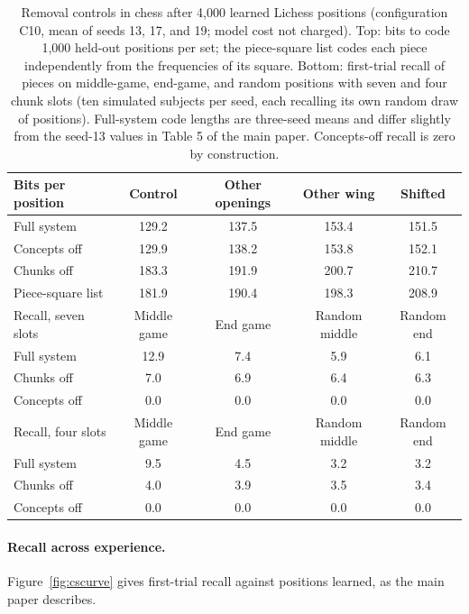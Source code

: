 \documentclass[11pt,letterpaper]{article}
\begin{document}
\begin{table}[h]
\caption{Removal controls in chess after 4,000 learned Lichess positions (configuration C10, mean of seeds 13, 17, and 19; model cost not charged). Top: bits to code 1,000 held-out positions per set; the piece-square list codes each piece independently from the frequencies of its square.
Bottom: first-trial recall of pieces on middle-game, end-game, and random positions with seven and four chunk slots (ten simulated subjects per seed, each recalling its own random draw of positions). Full-system code lengths are three-seed means and differ slightly from the seed-13 values in Table 5 of the main paper. Concepts-off recall is zero by construction.}
\label{tab:chess-abl}
\begin{center}
\small
\begin{tabular}{lcccc}
\toprule
Bits per position & Control & Other openings & Other wing & Shifted \\
\midrule
Full system & 129.2 & 137.5 & 153.4 & 151.5 \\
Concepts off & 129.9 & 138.2 & 153.8 & 152.1 \\
Chunks off & 183.3 & 191.9 & 200.7 & 210.7 \\
Piece-square list & 181.9 & 190.4 & 198.3 & 208.9 \\
\midrule
Recall, seven slots & Middle game & End game & Random middle & Random end \\
\midrule
Full system & 12.9 & 7.4 & 5.9 & 6.1 \\
Chunks off & 7.0 & 6.9 & 6.4 & 6.3 \\
Concepts off & 0.0 & 0.0 & 0.0 & 0.0 \\
\midrule
Recall, four slots & Middle game & End game & Random middle & Random end \\
\midrule
Full system & 9.5 & 4.5 & 3.2 & 3.2 \\
Chunks off & 4.0 & 3.9 & 3.5 & 3.4 \\
Concepts off & 0.0 & 0.0 & 0.0 & 0.0 \\
\bottomrule
\end{tabular}
\end{center}
\end{table}

\paragraph{Recall across experience.} Figure~\ref{fig:cscurve} gives first-trial recall against positions learned, as the main paper describes.
\end{document}
